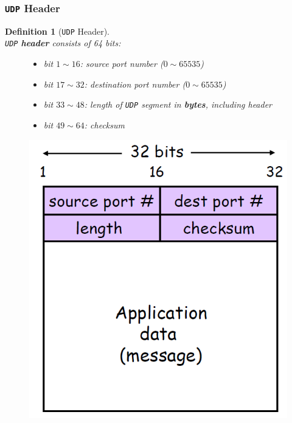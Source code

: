 \documentclass[12pt]{article}
\newcommand\UDP{\texttt{UDP} }
\newtheorem{definition}{Definition}[section]
\theoremstyle{definition}
\begin{document}
\subsubsection{\UDP Header}
\begin{definition}[\UDP Header]
\hfill\\\normalfont \UDP \textbf{header} consists of 64 bits:
\begin{figure}[h]
\begin{minipage}{0.55\textwidth}
\begin{itemize}
  \item bit $1\sim16$: source port number ($0\sim65535$)
  \item bit $17\sim32$: destination port number ($0\sim65535$)
  \item bit $33\sim48$: length of \UDP segment in \textbf{bytes}, including header
  \item bit $49\sim64$: checksum
\end{itemize}
\end{minipage}\hfill\begin{minipage}{0.3\textwidth}
\centering
\includegraphics[width=\textwidth]{4_2_2.png}
\end{minipage}
\end{figure}
\end{definition}
\clearpage
\end{document}
